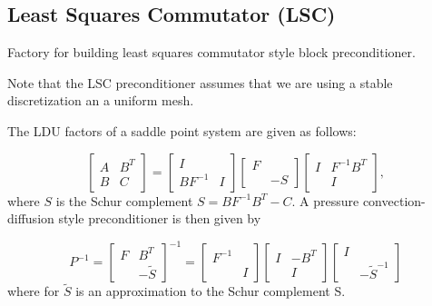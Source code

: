 \documentclass[oneeqnum,onefignum,onetabnum,10pt]{SANDreport}
\begin{document}
\subsection{Least Squares Commutator (LSC)}
Factory for building least squares commutator style block
preconditioner.  

Note that the LSC preconditioner assumes that we are using
a stable discretization an a uniform mesh.

The LDU factors of a saddle point system are given as follows:

\begin{equation}
  \left[ \begin{array}{cc} A & B^T \\ B & C \end{array} \right]
     = \left[ \begin{array}{cc} I & \\ BF^{-1} & I \end{array} \right]
       \left[ \begin{array}{cc} F & \\  & -S \end{array} \right]
       \left[ \begin{array}{cc} I & F^{-1} B^T  \\  & I \end{array} \right],
\end{equation}
where $S$ is the Schur complement $S = B F^{-1} B^T - C$.
A pressure convection-diffusion style preconditioner is then given by
     
\begin{equation}
     P^{-1} =
       \left[ \begin{array}{cc} F & B^T \\ & -\tilde S \end{array} \right]^{-1}
       = 
       \left[ \begin{array}{cc} F^{-1} &  \\  & I \end{array} \right]
       \left[ \begin{array}{cc} I & -B^T \\  & I \end{array} \right]
       \left[ \begin{array}{cc} I &  \\  & -\tilde S^{-1} \end{array} \right]
\end{equation}
where for $\tilde S$ is an approximation to the Schur complement S.
\end{document}
